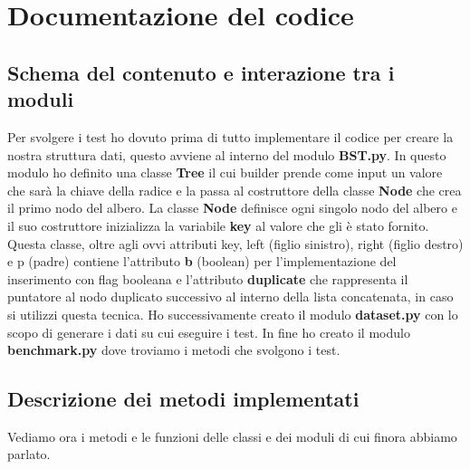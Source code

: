 \newpage
\section{Documentazione del codice}

\subsection{Schema del contenuto e interazione tra i moduli}
\label{sec:SchemaContenutoInterazioneModuli_1}
Per svolgere i test ho dovuto prima di tutto implementare il codice per creare la nostra struttura dati, questo avviene al interno del modulo \textbf{BST.py}. In questo modulo ho definito una classe \textbf{Tree} il cui builder prende come input un valore che sarà la chiave della radice e la passa al costruttore della classe \textbf{Node} che crea il primo nodo del albero.
La classe \textbf{Node} definisce ogni singolo nodo del albero e il suo costruttore inizializza la variabile \textbf{key} al valore che gli è stato fornito. Questa classe, oltre agli ovvi attributi key, left (figlio sinistro), right (figlio destro) e p (padre) contiene l'attributo \textbf{b} (boolean) per l'implementazione del inserimento con flag booleana e l'attributo \textbf{duplicate} che rappresenta il puntatore al nodo duplicato successivo al interno della lista concatenata, in caso si utilizzi questa tecnica.
Ho successivamente creato il modulo \textbf{dataset.py} con lo scopo di generare i dati su cui eseguire i test.
In fine ho creato il modulo \textbf{benchmark.py} dove troviamo i metodi che svolgono i test.

\subsection{Descrizione dei metodi implementati}
\label{sec:DescrizioneMetodiImplementati_1}
Vediamo ora i metodi e le funzioni delle classi e dei moduli di cui finora abbiamo parlato. 

